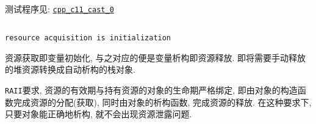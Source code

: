 测试程序见: \href{https://github.com/wenqingqian/Obtuse/tree/main/test/cpp/c++11/cast_0}{\tt cpp\_c11\_cast\_0}
\subsection{\color{purple}{\tt RAII}}
\subsubsection{\color{purple}{\tt RAII}}
{\tt resource acquisition is initialization}

资源获取即变量初始化, 与之对应的便是变量析构即资源释放. 即将需要手动释放的堆资源转换成自动析构的栈对象.

{\tt RAII}要求, 资源的有效期与持有资源的对象的生命期严格绑定, 即由对象的构造函数完成资源的分配(获取), 
同时由对象的析构函数, 完成资源的释放. 在这种要求下, 只要对象能正确地析构, 就不会出现资源泄露问题.

